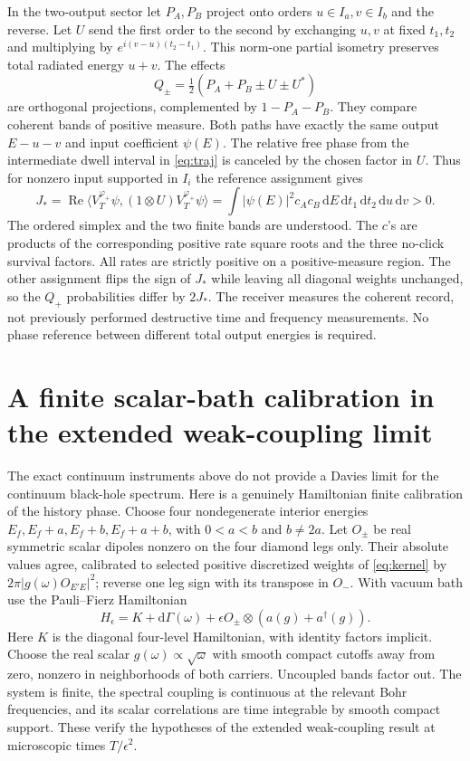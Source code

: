 \documentclass[11pt]{article}
\newcommand{\dd}{\mathrm d}
\begin{document}
In the two-output sector let \(P_A,P_B\) project onto orders \(u\in I_a,v\in I_b\) and the reverse. Let \(U\) send the first order to the second by exchanging \(u,v\) at fixed \(t_1,t_2\) and multiplying by \(e^{i(v-u)(t_2-t_1)}\). This norm-one partial isometry preserves total radiated energy \(u+v\). The effects
\[
     Q_\pm=\tfrac12(P_A+P_B\pm U\pm U^*)
\]
are orthogonal projections, complemented by \(1-P_A-P_B\). They compare coherent bands of positive measure. Both paths have exactly the same output \(E-u-v\) and input coefficient \(\psi(E)\). The relative free phase from the intermediate dwell interval in \eqref{eq:traj} is canceled by the chosen factor in \(U\). Thus for nonzero input supported in \(I_i\) the reference assignment gives
\begin{equation}
 J_*=\operatorname{Re}\langle V_T^{\varphi_+}\psi,
                     (1\otimes U)V_T^{\varphi_+}\psi\rangle
     =\int |\psi(E)|^2 c_Ac_B\,\dd E\,\dd t_1\,\dd t_2\,\dd u\,\dd v>0 . \label{eq:diamond}
\end{equation}
The ordered simplex and the two finite bands are understood. The \(c\)'s are products of the corresponding positive rate square roots and the three no-click survival factors. All rates are strictly positive on a positive-measure region. The other assignment flips the sign of \(J_*\) while leaving all diagonal weights unchanged, so the \(Q_+\) probabilities differ by \(2J_*\). The receiver measures the coherent record, not previously performed destructive time and frequency measurements. No phase reference between different total output energies is required.

\section{A finite scalar-bath calibration in the extended weak-coupling limit}
The exact continuum instruments above do not provide a Davies limit for the continuum black-hole spectrum. Here is a genuinely Hamiltonian finite calibration of the history phase. Choose four nondegenerate interior energies \(E_f,E_f+a,E_f+b,E_f+a+b\), with \(0<a<b\) and \(b\ne2a\). Let \(O_\pm\) be real symmetric scalar dipoles nonzero on the four diamond legs only. Their absolute values agree, calibrated to selected positive discretized weights of \eqref{eq:kernel} by \(2\pi|g(\omega)O_{E'E}|^2\); reverse one leg sign with its transpose in \(O_-\). With vacuum bath use the Pauli--Fierz Hamiltonian
\[
 H_\epsilon=K+\dd\Gamma(\omega)
               +\epsilon O_\pm\otimes(a(g)+a^\dagger(g)).
\]
Here \(K\) is the diagonal four-level Hamiltonian, with identity factors implicit. Choose the real scalar \(g(\omega)\propto\sqrt{\omega}\) with smooth compact cutoffs away from zero, nonzero in neighborhoods of both carriers. Uncoupled bands factor out. The system is finite, the spectral coupling is continuous at the relevant Bohr frequencies, and its scalar correlations are time integrable by smooth compact support. These verify the hypotheses of the extended weak-coupling result \cite[Assumptions 4.2--4.4 and Theorem 5.4]{dere} at microscopic times \(T/\epsilon^2\).
\end{document}
